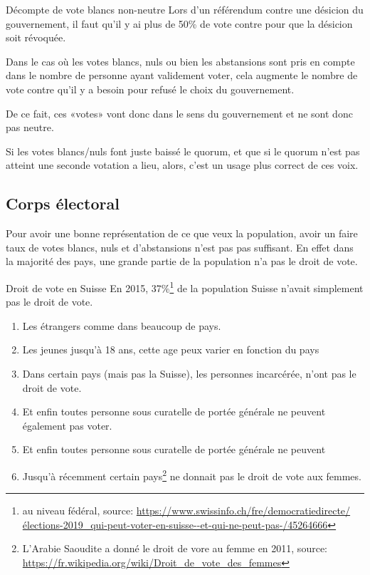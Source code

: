 \documentclass[../report]{subfiles}
\begin{document}
  \begin{nota}{Décompte de vote blancs non-neutre}
    Lors d'un référendum contre une désicion du gouvernement, il faut qu'il y ai plus de 50\% 
    de vote contre pour que la désicion soit révoquée.

    Dans le cas où les votes blancs, nuls ou bien les abstansions sont pris en compte dans 
    le nombre de personne ayant validement voter, cela augmente le nombre de vote contre 
    qu'il y a besoin pour refusé le choix du gouvernement.

    De ce fait, ces «votes» vont donc dans le sens du gouvernement et ne sont donc pas neutre. 

    Si les votes blancs/nuls font juste baissé le quorum, et que si le quorum n'est pas atteint
    une seconde votation a lieu, alors, c'est un usage plus correct de ces voix.

  \end{nota}


  \subsection{Corps électoral}

  Pour avoir une bonne représentation de ce que veux la population, avoir un faire taux de votes
  blancs, nuls et d'abstansions n'est pas pas suffisant.
  En effet dans la majorité des pays, une grande partie de la population n'a pas le droit de vote.

  \begin{nota}{Droit de vote en Suisse}
    En 2015, 37\%\footnote{au niveau fédéral, source: \url{https://www.swissinfo.ch/fre/democratiedirecte/élections-2019\_qui-peut-voter-en-suisse--et-qui-ne-peut-pas-/45264666}}
    de la population Suisse n'avait simplement pas le droit de vote.
    \begin{enumerate}
      \item Les étrangers comme dans beaucoup de pays.
      \item Les jeunes jusqu'à 18 ans, cette age peux varier en fonction du pays
      \item Dans certain pays (mais pas la Suisse), les personnes incarcérée, n'ont pas 
        le droit de vote.
      \item Et enfin toutes personne sous curatelle de portée générale ne peuvent 
        également pas voter.
      \item Et enfin toutes personne sous curatelle de portée générale ne peuvent 
      \item Jusqu'à récemment certain pays\footnote{L'Arabie Saoudite a donné le droit de vore au femme en 2011, source: \url{https://fr.wikipedia.org/wiki/Droit\_de\_vote\_des\_femmes}} ne donnait pas le droit de vote aux femmes.
    \end{enumerate}
  \end{nota}
\end{document}
